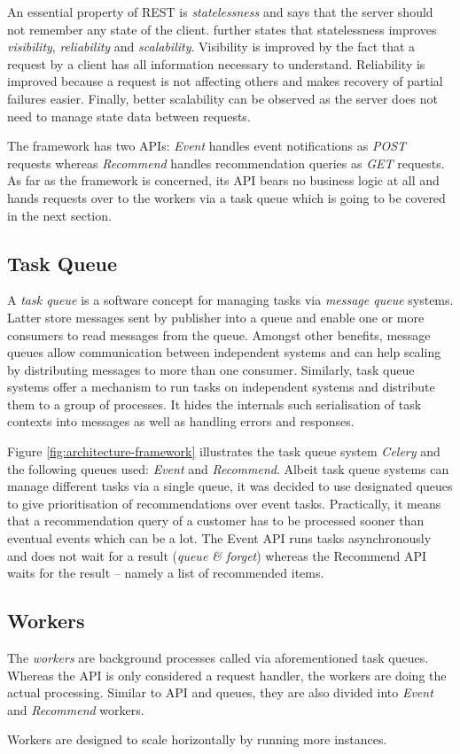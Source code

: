 An essential property of REST is \emph{statelessness} and says that the server should not remember any state of the client. \citet{fielding00} further states that statelessness improves \emph{visibility}, \emph{reliability} and \emph{scalability}. Visibility is improved by the fact that a  request by a client has all information necessary to understand. Reliability is improved because a request is not affecting others and makes recovery of partial failures easier. Finally, better scalability can be observed as the server does not need to manage state data between requests.

The framework has two APIs: \emph{Event} handles event notifications as \emph{POST} requests whereas \emph{Recommend} handles recommendation queries as \emph{GET} requests. As far as the framework is concerned, its API bears no business logic at all and hands requests over to the workers via a task queue which is going to be covered in the next section.

\subsection{Task Queue}

A \emph{task queue} is a software concept for managing tasks via \emph{message queue} systems. Latter store messages sent by publisher into a queue and enable one or more consumers to read messages from the queue. Amongst other benefits, message queues allow communication between independent systems and can help scaling by distributing messages to more than one consumer. Similarly, task queue systems offer a mechanism to run tasks on independent systems and distribute them to a group of processes. It hides the internals such serialisation of task contexts into messages as well as handling errors and responses.

Figure \ref{fig:architecture-framework} illustrates the task queue system \emph{Celery} and the following queues used: \emph{Event} and \emph{Recommend}. Albeit task queue systems can manage different tasks via a single queue, it was decided to use designated queues to give prioritisation of recommendations over event tasks. Practically, it means that a recommendation query of a customer has to be processed sooner than eventual events which can be a lot. The Event API runs tasks asynchronously and does not wait for a result (\emph{queue \& forget}) whereas the Recommend API waits for the result -- namely a list of recommended items.

\subsection{Workers}

The \emph{workers} are background processes called via aforementioned task queues. Whereas the API is only considered a request handler, the workers are doing the actual processing. Similar to API and queues, they are also divided into \emph{Event} and \emph{Recommend} workers.

Workers are designed to scale horizontally by running more instances.

